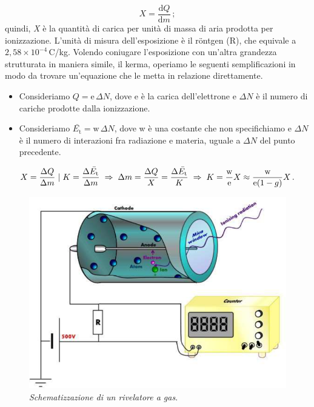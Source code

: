 \documentclass{report}
\numberwithin{equation}{section}
\numberwithin{figure}{section}
\begin{document}
\begin{equation}
    X = \frac{\mathrm{d}Q}{\mathrm{d}m}\,;
\end{equation}
quindi, \textit{X} è la quantità di carica per unità di massa di aria prodotta per ionizzazione. L'unità di misura dell'esposizione è il röntgen (R), che equivale a $2,58\times10^{-4}$\,C/kg. Volendo coniugare l'esposizione con un'altra grandezza strutturata in maniera simile, il kerma, operiamo le seguenti semplificazioni in modo da trovare un'equazione che le metta in relazione direttamente.
\begin{itemize}[label=$\triangleright$]
    \item Consideriamo $Q = \mathrm{e}\,\Delta N$, dove e è la carica dell'elettrone e $\Delta N$ è il numero di cariche prodotte dalla ionizzazione.
    \item Consideriamo $\bar{E_\mathrm{t}} = \mathrm{w}\,\Delta N$, dove w è una costante che non specifichiamo e $\Delta N$ è il numero di interazioni fra radiazione e materia, uguale a $\Delta N$ del punto precedente.
\end{itemize}
\begin{equation}
X = \frac{\Delta Q}{\Delta m}\hspace{3 pt} | \hspace{3 pt}K = \frac{\Delta \bar{E_\mathrm{t}}}{\Delta m}\hspace{3 pt} \Rightarrow \hspace{3 pt}\Delta m = \frac{\Delta Q}{X} = \frac{\Delta \bar{E_\mathrm{t}}}{K}\hspace{3 pt} \Rightarrow \hspace{3 pt}K = \frac{\mathrm{w}}{\mathrm{e}}X \approx \frac{\mathrm{w}}{\mathrm{e}(1-g)}X\,.
\end{equation}

\begin{figure}[htp]
\centering
\includegraphics[scale=0.62]{immagini/geiger.png}
\caption{\label{fig:geiger} \textit{Schematizzazione di un rivelatore a gas}.}
\end{figure}
\end{document}
